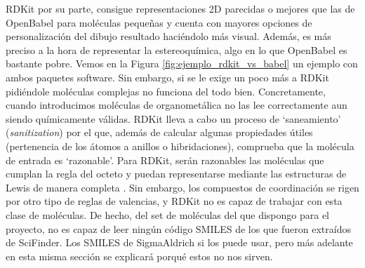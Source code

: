 RDKit por su parte, consigue representaciones 2D parecidas o mejores que las de OpenBabel para moléculas pequeñas y cuenta con mayores opciones de personalización del dibujo resultado \cite{rdkit_cookbook} haciéndolo más visual. Además, es más preciso a la hora de representar la estereoquímica, algo en lo que OpenBabel es bastante pobre. Vemos en la Figura \ref{fig:ejemplo_rdkit_vs_babel} un ejemplo con ambos paquetes software. Sin embargo, si se le exige un poco más a RDKit pidiéndole moléculas complejas no funciona del todo bien. Concretamente, cuando introducimos moléculas de organometálica no las lee correctamente aun siendo químicamente válidas. RDKit lleva a cabo un proceso de `saneamiento' (\textit{sanitization}) \cite{rdkit_docbook} por el que, además de calcular algunas propiedades útiles (pertenencia de los átomos a anillos o hibridaciones), comprueba que la molécula de entrada es `razonable'. Para RDKit, serán razonables las moléculas que cumplan la regla del octeto \cite{lewis2} y puedan representarse mediante las estructuras de Lewis de manera completa \cite{lewis_2013, lewis2}. Sin embargo, los compuestos de coordinación se rigen por otro tipo de reglas de valencias, y RDKit no es capaz de trabajar con esta clase de moléculas. De hecho, del set de moléculas del que dispongo para el proyecto, no es capaz de leer ningún código SMILES de los que fueron extraídos de SciFinder. Los SMILES de SigmaAldrich si los puede usar, pero más adelante en esta misma sección se explicará porqué estos no nos sirven.

